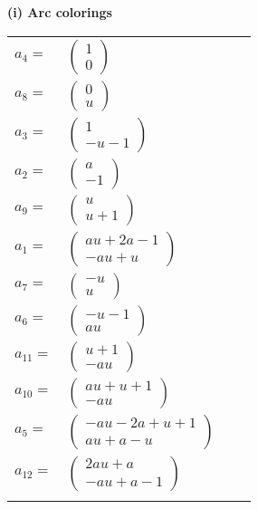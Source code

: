 \documentclass[1p]{elsarticle_modified}
\theoremstyle{definition}
\begin{document}
\flushleft \textbf{(i) Arc colorings}\\
\begin{tabular}{m{7pt} m{180pt} m{7pt} m{180pt} }
\flushright $a_{4}=$&$\begin{pmatrix}1\\0\end{pmatrix}$ \\
\flushright $a_{8}=$&$\begin{pmatrix}0\\u\end{pmatrix}$ \\
\flushright $a_{3}=$&$\begin{pmatrix}1\\- u-1\end{pmatrix}$ \\
\flushright $a_{2}=$&$\begin{pmatrix}a\\-1\end{pmatrix}$ \\
\flushright $a_{9}=$&$\begin{pmatrix}u\\u+1\end{pmatrix}$ \\
\flushright $a_{1}=$&$\begin{pmatrix}a u+2 a-1\\- a u+u\end{pmatrix}$ \\
\flushright $a_{7}=$&$\begin{pmatrix}- u\\u\end{pmatrix}$ \\
\flushright $a_{6}=$&$\begin{pmatrix}- u-1\\a u\end{pmatrix}$ \\
\flushright $a_{11}=$&$\begin{pmatrix}u+1\\- a u\end{pmatrix}$ \\
\flushright $a_{10}=$&$\begin{pmatrix}a u+u+1\\- a u\end{pmatrix}$ \\
\flushright $a_{5}=$&$\begin{pmatrix}- a u-2 a+u+1\\a u+a- u\end{pmatrix}$ \\
\flushright $a_{12}=$&$\begin{pmatrix}2 a u+a\\- a u+a-1\end{pmatrix}$\\&\end{tabular}
\end{document}
